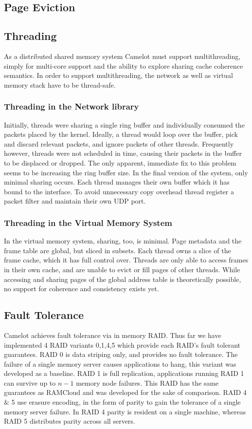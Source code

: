 \subsection{Page Eviction} 

\subsection{Threading} 
As a distributed shared memory system Camelot must support multithreading, simply for multi-core support and the ability to explore sharing cache coherence semantics.
In order to support multithreading, the network as well as virtual memory stack have to be thread-safe.
\subsubsection{Threading in the Network library}
Initially, threads were sharing a single ring buffer and individually consumed the packets placed by the kernel. Ideally, a thread would loop over the buffer, pick and discard relevant packets, and ignore packets of other threads. Frequently however, threads were not scheduled in time, causing their packets in the buffer to be displaced or dropped. The only apparent, immediate fix to this problem seems to be increasing the ring buffer size.
In the final version of the system, only minimal sharing occurs. Each thread manages their own buffer which it has bound to the interface. To avoid unnecessary copy overhead thread register a packet filter and maintain their own UDP port.

\subsubsection{Threading in the Virtual Memory System}
In the virtual memory system,  sharing, too, is minimal. Page metadata and the frame table are global, but sliced in subsets. Each thread owns a slice of the frame cache, which it has full control over. Threads are only able to access frames in their own cache, and are unable to evict or fill pages of other threads. While accessing and sharing pages of the global address table is theoretically possible, no support for coherence and consistency exists yet. 

\subsection{Fault Tolerance} 

Camelot achieves fault tolerance via in memory RAID. Thus far we have
implemented 4 RAID variants 0,1,4,5 which provide each RAID's fault
tolerant guarantees. RAID 0 is data striping only, and provides no
fault tolerance. The failure of a single memory server causes
applications to hang, this variant was developed as a baseline. RAID 1
is full replication, applications running RAID 1 can survive up to
$n-1$ memory node failures. This RAID has the same guarantees as
RAMCloud and was developed for the sake of comparison. RAID 4 \& 5
use erasure encoding, in the form of parity to gain the tolerance of
a single memory server failure. In RAID 4 parity is resident on a
single machine, whereas RAID 5 distributes parity across all servers.

